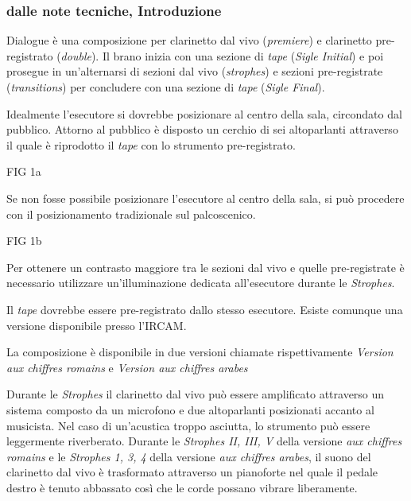 
\subsubsection{dalle note tecniche, Introduzione}

Dialogue è una composizione per clarinetto dal vivo (\emph{premiere}) e clarinetto pre-registrato (\emph{double}). Il brano inizia con una sezione di \emph{tape} (\emph{Sigle Initial}) e poi prosegue in un'alternarsi di sezioni dal vivo (\emph{strophes}) e sezioni pre-registrate (\emph{transitions}) per concludere con una sezione di \emph{tape} (\emph{Sigle Final}).

Idealmente l'esecutore si dovrebbe posizionare al centro della sala, circondato dal pubblico. Attorno al pubblico è disposto un cerchio di sei altoparlanti attraverso il quale è riprodotto il \emph{tape} con lo strumento pre-registrato.

FIG 1a

Se non fosse possibile posizionare l'esecutore al centro della sala, si può procedere con il posizionamento tradizionale sul palcoscenico.

FIG 1b

Per ottenere un contrasto maggiore tra le sezioni dal vivo e quelle pre-registrate è necessario utilizzare un'illuminazione dedicata all'esecutore durante le \emph{Strophes}.

Il \emph{tape} dovrebbe essere pre-registrato dallo stesso esecutore. Esiste comunque una versione disponibile presso l'IRCAM.

La composizione è disponibile in due versioni chiamate rispettivamente \emph{Version aux chiffres romains} e \emph{Version aux chiffres arabes}


Durante le \emph{Strophes} il clarinetto dal vivo può essere amplificato attraverso un sistema composto da un microfono e due altoparlanti posizionati accanto al musicista. Nel caso di un'acustica troppo asciutta, lo strumento può essere leggermente riverberato. Durante le \emph{Strophes II, III, V} della versione \emph{aux chiffres romains} e le \emph{Strophes 1, 3, 4} della versione \emph{aux chiffres arabes}, il suono del clarinetto dal vivo è trasformato attraverso un pianoforte nel quale il pedale destro è tenuto abbassato così che le corde possano vibrare liberamente.

